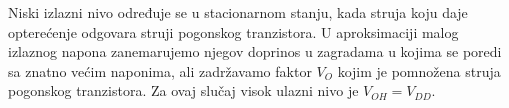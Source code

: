 Niski izlazni nivo određuje se u stacionarnom stanju, kada struja koju daje opterećenje odgovara struji pogonskog tranzistora. U aproksimaciji malog izlaznog napona zanemarujemo njegov doprinos u zagradama u kojima se poredi sa znatno većim naponima, ali zadržavamo faktor $V_O$ kojim je pomnožena struja pogonskog tranzistora. Za ovaj slučaj visok ulazni nivo je $V_{OH}=V_{DD}$.
